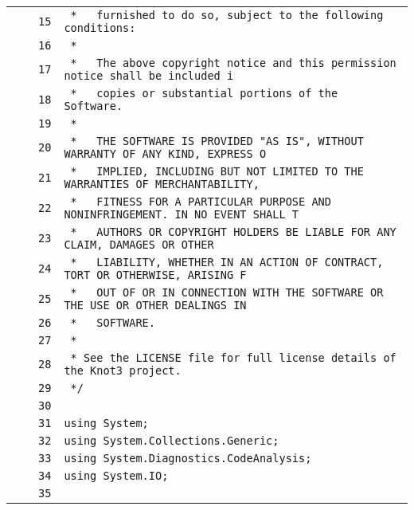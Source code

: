 \documentclass[a4paper,10pt]{article}
\begin{document}
\begin{longtable}[l]{lrrl}
\cellcolor{gray} &  & \verb~15~ & \verb~ *   furnished to do so, subject to the following conditions:~\\
\cellcolor{gray} &  & \verb~16~ & \verb~ *~\\
\cellcolor{gray} &  & \verb~17~ & \verb~ *   The above copyright notice and this permission notice shall be included i~\\
\cellcolor{gray} &  & \verb~18~ & \verb~ *   copies or substantial portions of the Software.~\\
\cellcolor{gray} &  & \verb~19~ & \verb~ *~\\
\cellcolor{gray} &  & \verb~20~ & \verb~ *   THE SOFTWARE IS PROVIDED "AS IS", WITHOUT WARRANTY OF ANY KIND, EXPRESS O~\\
\cellcolor{gray} &  & \verb~21~ & \verb~ *   IMPLIED, INCLUDING BUT NOT LIMITED TO THE WARRANTIES OF MERCHANTABILITY,~\\
\cellcolor{gray} &  & \verb~22~ & \verb~ *   FITNESS FOR A PARTICULAR PURPOSE AND NONINFRINGEMENT. IN NO EVENT SHALL T~\\
\cellcolor{gray} &  & \verb~23~ & \verb~ *   AUTHORS OR COPYRIGHT HOLDERS BE LIABLE FOR ANY CLAIM, DAMAGES OR OTHER~\\
\cellcolor{gray} &  & \verb~24~ & \verb~ *   LIABILITY, WHETHER IN AN ACTION OF CONTRACT, TORT OR OTHERWISE, ARISING F~\\
\cellcolor{gray} &  & \verb~25~ & \verb~ *   OUT OF OR IN CONNECTION WITH THE SOFTWARE OR THE USE OR OTHER DEALINGS IN~\\
\cellcolor{gray} &  & \verb~26~ & \verb~ *   SOFTWARE.~\\
\cellcolor{gray} &  & \verb~27~ & \verb~ *~\\
\cellcolor{gray} &  & \verb~28~ & \verb~ * See the LICENSE file for full license details of the Knot3 project.~\\
\cellcolor{gray} &  & \verb~29~ & \verb~ */~\\
\cellcolor{gray} &  & \verb~30~ & \verb~~\\
\cellcolor{gray} &  & \verb~31~ & \verb~using System;~\\
\cellcolor{gray} &  & \verb~32~ & \verb~using System.Collections.Generic;~\\
\cellcolor{gray} &  & \verb~33~ & \verb~using System.Diagnostics.CodeAnalysis;~\\
\cellcolor{gray} &  & \verb~34~ & \verb~using System.IO;~\\
\cellcolor{gray} &  & \verb~35~ & \verb~~\\

\end{longtable}
\end{document}
